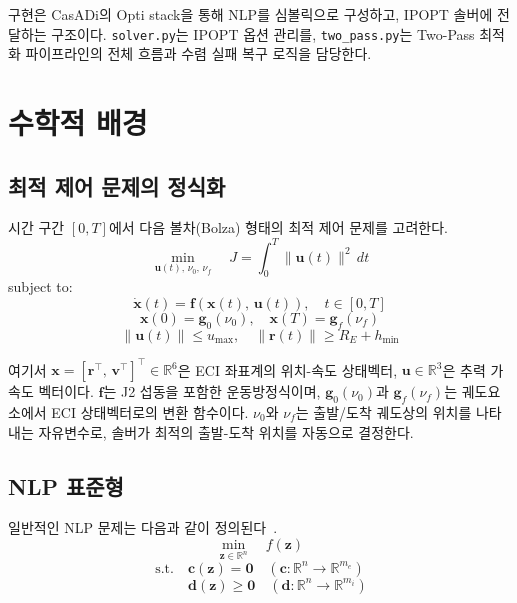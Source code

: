 \documentclass[11pt]{article}
\begin{document}
구현은 CasADi의 Opti stack을 통해 NLP를 심볼릭으로 구성하고, IPOPT 솔버에 전달하는 구조이다. \texttt{solver.py}는 IPOPT 옵션 관리를, \texttt{two\_pass.py}는 Two-Pass 최적화 파이프라인의 전체 흐름과 수렴 실패 복구 로직을 담당한다.


\section{수학적 배경}

\subsection{최적 제어 문제의 정식화}

시간 구간 $[0, T]$에서 다음 볼차(Bolza) 형태의 최적 제어 문제를 고려한다.
%
\begin{equation}\label{eq:ocp-cost}
\min_{\mathbf{u}(t),\, \nu_0,\, \nu_f} \quad J = \int_0^T \|\mathbf{u}(t)\|^2 \, dt
\end{equation}
%
subject to:
%
\begin{equation}\label{eq:ocp-dynamics}
\dot{\mathbf{x}}(t) = \mathbf{f}(\mathbf{x}(t),\, \mathbf{u}(t)), \quad t \in [0, T]
\end{equation}
%
\begin{equation}\label{eq:ocp-bc}
\mathbf{x}(0) = \mathbf{g}_0(\nu_0), \quad \mathbf{x}(T) = \mathbf{g}_f(\nu_f)
\end{equation}
%
\begin{equation}\label{eq:ocp-ineq}
\|\mathbf{u}(t)\| \leq u_{\max}, \quad \|\mathbf{r}(t)\| \geq R_E + h_{\min}
\end{equation}

여기서 $\mathbf{x} = [\mathbf{r}^\top,\, \mathbf{v}^\top]^\top \in \mathbb{R}^6$은 ECI 좌표계의 위치-속도 상태벡터, $\mathbf{u} \in \mathbb{R}^3$은 추력 가속도 벡터이다. $\mathbf{f}$는 J2 섭동을 포함한 운동방정식이며, $\mathbf{g}_0(\nu_0)$과 $\mathbf{g}_f(\nu_f)$는 궤도요소에서 ECI 상태벡터로의 변환 함수이다. $\nu_0$와 $\nu_f$는 출발/도착 궤도상의 위치를 나타내는 자유변수로, 솔버가 최적의 출발-도착 위치를 자동으로 결정한다.

\subsection{NLP 표준형}

일반적인 NLP 문제는 다음과 같이 정의된다~\cite{Nocedal2006}.
%
\begin{equation}\label{eq:nlp-obj}
\min_{\mathbf{z} \in \mathbb{R}^n} \quad f(\mathbf{z})
\end{equation}
%
\[
\text{s.t.} \quad \mathbf{c}(\mathbf{z}) = \mathbf{0} \quad (\mathbf{c} : \mathbb{R}^n \to \mathbb{R}^{m_e})
\]
%
\[
\quad\quad\;\; \mathbf{d}(\mathbf{z}) \geq \mathbf{0} \quad (\mathbf{d} : \mathbb{R}^n \to \mathbb{R}^{m_i})
\]
\end{document}
